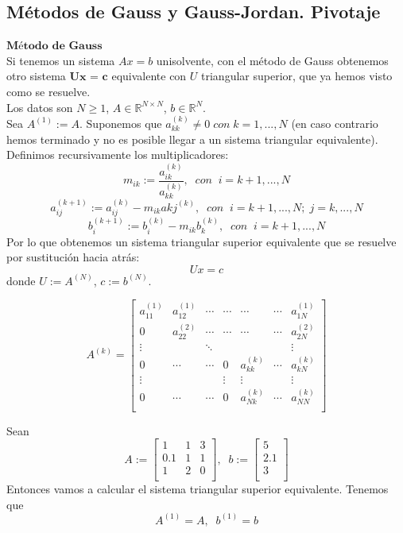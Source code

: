 \subsection{Métodos de Gauss y Gauss-Jordan. Pivotaje}
\begin{nlist}
\item $\textbf{Método de Gauss}$\\
Si tenemos un sistema $Ax = b$ unisolvente, con el método de Gauss obtenemos otro sistema $\textbf{Ux = c}$ equivalente con $U$ triangular superior, que ya hemos visto como se resuelve.\\
Los datos son $N \geq 1$, $A \in \mathbb{R}^{N \times N}$, $b \in \mathbb{R}^N$.\\
Sea $A^{(1)} := A$. Suponemos que $a_{kk}^{(k)} \neq 0 \; con \; k = 1,...,N$ (en caso contrario hemos terminado y no es posible llegar a un sistema triangular equivalente). Definimos recursivamente los multiplicadores:
\[ m_{ik} := \frac{a_{ik}^{(k)}}{a_{kk}^{(k)}}, \; \; con \; \; i = k+1,...,N \]
\[ a_{ij}^{(k+1)} := a_{ij}^{(k)} - m_{ik}a{kj}^{(k)}, \; \; con \; \; i = k+1,...,N; \; j = k,...,N \]
\[ b_i^{(k+1)} := b_i^{(k)} - m_{ik}b_{k}^{(k)}, \; \; con \; \; i = k+1,...,N \]
Por lo que obtenemos un sistema triangular superior equivalente que se resuelve por sustitución hacia atrás:
\[ Ux = c \]
donde $U := A^{(N)}$, $c := b^{(N)}$.

\[ A^{(k)} = \begin{bmatrix}
a_{11}^{(1)} & a_{12}^{(1)} & \cdots & \cdots & \cdots & \cdots & a_{1N}^{(1)} \\
0 & a_{22}^{(2)} & \cdots & \cdots & \cdots & \cdots & a_{2N}^{(2)} \\
\vdots & & \ddots & & & & \vdots \\
0 & \cdots & \cdots & 0 & a_{kk}^{(k)} & \cdots & a_{kN}^{(k)} \\
\vdots & & & \vdots & \vdots & & \vdots \\
0 & \cdots & \cdots & 0 & a_{Nk}^{(k)} & \cdots & a_{NN}^{(k)}\\
\end{bmatrix}\]

	\begin{ejemplo}
	Sean
	\[ A := 
	\begin{bmatrix}
	1 & 1 & 3 \\
	0.1 & 1 & 1 \\
	1 & 2 & 0 \\
	\end{bmatrix}, \; \;
	b :=
	\begin{bmatrix}
	5 \\
	2.1 \\
	3 \\
	\end{bmatrix} \]
	Entonces vamos a calcular el sistema triangular superior equivalente.
	Tenemos que
	\[ A^{(1)} = A, \; \; b^{(1)} = b \]
			

\end{ejemplo}
\end{nlist}
